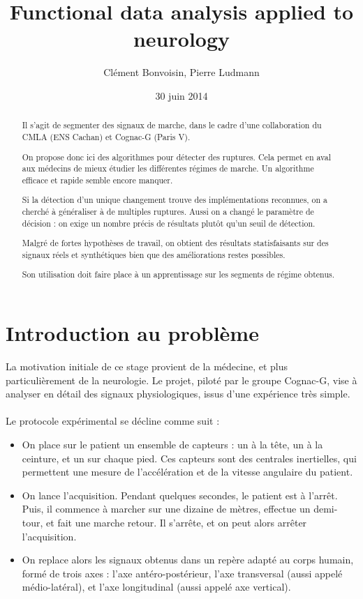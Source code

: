 \documentclass[french,12pt]{report}
\begin{document}
	\title{Functional data analysis applied to neurology}
	\author{Clément Bonvoisin, Pierre Ludmann}
	\date{30 juin 2014}
	\maketitle

	\begin{abstract}
  
Il s'agit de segmenter des signaux de marche,
dans le cadre d'une collaboration du CMLA (ENS Cachan) et Cognac-G (Paris V).

On propose donc ici des algorithmes pour détecter des ruptures.
Cela permet en aval aux médecins de mieux étudier les différentes régimes de marche.
Un algorithme efficace et rapide semble encore manquer.

Si la détection d'un unique changement trouve des implémentations reconnues,
on a cherché à généraliser à de multiples ruptures.
Aussi on a changé le paramètre de décision : on exige un nombre précis de résultats plutôt qu'un seuil de détection.

Malgré de fortes hypothèses de travail,
on obtient des résultats statisfaisants sur des signaux réels et synthétiques
bien que des améliorations restes possibles.

Son utilisation doit faire place à un apprentissage sur les segments de régime obtenus.
	
	\end{abstract}

	\tableofcontents

	\chapter{Introduction au problème}
	
		La motivation initiale de ce stage provient de la médecine, et plus particulièrement de la neurologie. Le projet, piloté par le groupe Cognac-G, vise à analyser en détail des signaux physiologiques, issus d'une expérience très simple.
	\\ \\
	Le protocole expérimental se décline comme suit :
	\begin{itemize}
		\item On place sur le patient un ensemble de capteurs : un à la tête, un à la ceinture, et un sur chaque pied. Ces capteurs sont des centrales inertielles, qui permettent une mesure de l'accélération et de la vitesse angulaire du patient.
		\item On lance l'acquisition. Pendant quelques secondes, le patient est à l'arrêt. Puis, il commence à marcher sur une dizaine de mètres, effectue un demi-tour, et fait une marche retour. Il s'arrête, et on peut alors arrêter l'acquisition.
		\item On replace alors les signaux obtenus dans un repère adapté au corps humain, formé de trois axes : l'axe antéro-postérieur, l'axe transversal (aussi appelé médio-latéral), et l'axe longitudinal (aussi appelé axe vertical).
	\end{itemize}
	
\end{document}
